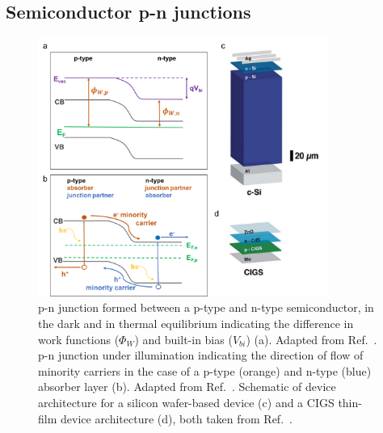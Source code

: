 \documentclass[11pt, twoside]{report}
\begin{document}
\subsection{Semiconductor p-n junctions}
\begin{figure}[h!]
  \centering
    \includegraphics[width=0.85\textwidth]{figures/p-n_schematic.png}
    \caption[p-n junction formed between a p-type and n-type semiconductor, in the dark and in thermal equilibrium indicating the difference in work functions ($\Phi_W$) and built-in bias ($V_{bi}$) (a). p-n junction under illumination indicating the direction of flow of minority carriers in the case of a p-type (orange) and n-type (blue) absorber layer (b). Schematic of device architecture for a silicon wafer-based device (c) and a CIGS thin-film device architecture (d).]{p-n junction formed between a p-type and n-type semiconductor, in the dark and in thermal equilibrium indicating the difference in work functions ($\Phi_W$) and built-in bias ($V_{bi}$) (a). Adapted from Ref.~. p-n junction under illumination indicating the direction of flow of minority carriers in the case of a p-type (orange) and n-type (blue) absorber layer (b). Adapted from Ref.~. Schematic of device architecture for a silicon wafer-based device (c) and a CIGS thin-film device architecture (d), both taken from Ref.~.}
  \label{p-n_schematic}
\end{figure}
\end{document}
